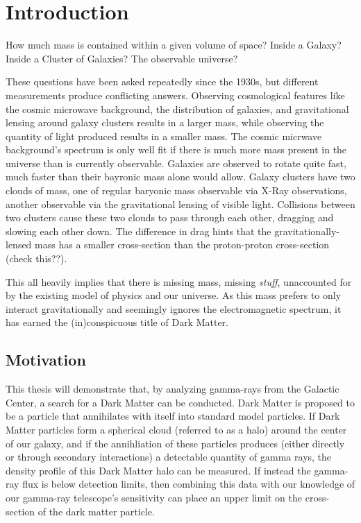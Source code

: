 \cleartooddpage[\thispagestyle{empty}]
\chapter{Introduction}

  How much mass is contained within a given volume of space?
  Inside a Galaxy?
  Inside a Cluster of Galaxies?
  The observable universe?

  These questions have been asked repeatedly since the 1930s, but different measurements produce conflicting answers.
  Observing cosmological features like the cosmic microwave background, the distribution of galaxies, and gravitational lensing around galaxy clusters results in a larger mass, while observing the quantity of light produced results in a smaller mass.
  The cosmic micrwave background's spectrum is only well fit if there is much more mass present in the universe than is currently observable.
  Galaxies are observed to rotate quite fast, much faster than their bayronic mass alone would allow.
  Galaxy clusters have two clouds of mass, one of regular baryonic mass observable via X-Ray observations, another observable via the gravitational lensing of visible light.
  Collisions between two clusters cause these two clouds to pass through each other, dragging and slowing each other down.
  The difference in drag hints that the gravitationally-lensed mass has a smaller cross-section than the proton-proton cross-section {\color{red}(check this??)}.
  
  This all heavily implies that there is missing mass, missing \textit{stuff}, unaccounted for by the existing model of physics and our universe.
  As this mass prefers to only interact gravitationally and seemingly ignores the electromagnetic spectrum, it has earned the (in)conspicuous title of Dark Matter.

\section{Motivation}
  This thesis will demonstrate that, by analyzing gamma-rays from the Galactic Center, a search for a Dark Matter can be conducted.
  Dark Matter is proposed to be a particle that annihilates with itself into standard model particles.
  If Dark Matter particles form a spherical cloud (referred to as a halo) around the center of our galaxy, and if the annihliation of these particles produces (either directly or through secondary interactions) a detectable quantity of gamma rays, the density profile of this Dark Matter halo can be measured.
  If instead the gamma-ray flux is below detection limits, then combining this data with our knowledge of our gamma-ray telescope's sensitivity can place an upper limit on the cross-section of the dark matter particle.

